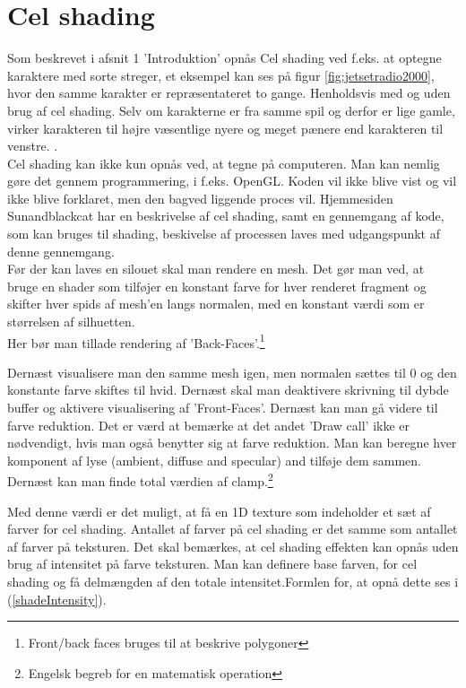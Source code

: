 \section{Cel shading}
Som beskrevet i afsnit 1 'Introduktion' opnås Cel shading ved f.eks. at optegne karaktere med sorte streger, et eksempel kan ses på figur \ref{fig:jetsetradio2000}, hvor den samme karakter er repræsentateret to gange. Henholdsvis med og uden brug af cel shading. Selv om karakterne er fra samme spil og derfor er lige gamle, virker karakteren til højre væsentlige nyere og meget pænere end karakteren til venstre. 
.\\

Cel shading kan ikke kun opnås ved, at tegne på computeren. Man kan nemlig gøre det gennem programmering, i f.eks. OpenGL. Koden vil ikke blive vist og vil ikke blive forklaret, men den bagved liggende proces vil. Hjemmesiden Sunandblackcat \cite{sunandblackcat2016} har en beskrivelse af cel shading, samt en gennemgang af kode, som kan bruges til shading, beskivelse af processen laves med udgangspunkt af denne gennemgang.\\
Før der kan laves en silouet skal man rendere en mesh. Det gør man ved, at bruge en shader som tilføjer en konstant farve for hver renderet fragment og skifter hver spids af mesh’en langs normalen, med en konstant værdi som er størrelsen af silhuetten.\\ Her bør man tillade rendering af ’Back-Faces’.\footnote[1]{Front/back faces bruges til at beskrive polygoner}

Dernæst visualisere man den samme mesh igen, men normalen sættes til 0 og den konstante farve skiftes til hvid.  Dernæst skal man deaktivere skrivning til dybde buffer og aktivere visualisering af ’Front-Faces’. Dernæst kan man gå videre til farve reduktion. Det er værd at bemærke at det andet ’Draw call’ ikke er nødvendigt, hvis man også benytter sig at farve reduktion. 
Man kan beregne hver komponent af lyse (ambient, diffuse and specular) and tilføje dem sammen. Dernæst kan man finde total værdien af clamp.\footnote[2]{Engelsk begreb for en matematisk operation}

Med denne værdi er det muligt, at få en 1D texture som indeholder et sæt af farver for cel shading. Antallet af farver på cel shading er det samme som antallet af farver på teksturen. Det skal bemærkes, at cel shading effekten kan opnås uden brug af intensitet på farve teksturen. 
Man kan definere base farven, for cel shading og få delmængden af den totale intensitet.Formlen for, at opnå dette ses i (\ref{shadeIntensity}). 
 
